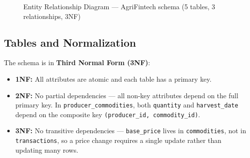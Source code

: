 \documentclass[12pt, a4paper]{article}
\begin{document}
\begin{figure}[H]
\caption{Entity Relationship Diagram — AgriFintech schema (5 tables, 3 relationships, 3NF)}
\label{fig:erd}
\end{figure}

\subsection{Tables and Normalization}

The schema is in \textbf{Third Normal Form (3NF)}:
\begin{itemize}[leftmargin=1.5em]
  \item \textbf{1NF:} All attributes are atomic and each table has a primary key.
  \item \textbf{2NF:} No partial dependencies — all non-key attributes depend on the
        full primary key. In \texttt{producer\_commodities}, both
        \texttt{quantity} and \texttt{harvest\_date} depend on the composite key
        \texttt{(producer\_id, commodity\_id)}.
  \item \textbf{3NF:} No transitive dependencies — \texttt{base\_price} lives in
        \texttt{commodities}, not in \texttt{transactions}, so a price change
        requires a single update rather than updating many rows.
\end{itemize}
\end{document}
